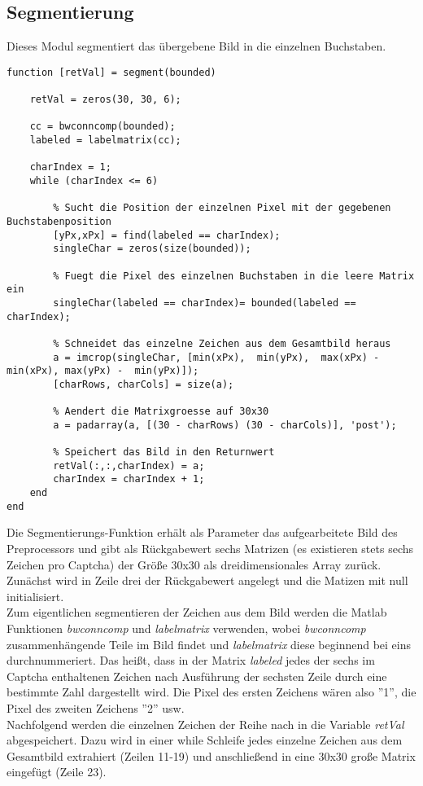 \subsection{Segmentierung}
Dieses Modul segmentiert das übergebene Bild in die einzelnen Buchstaben.
\begin{lstlisting}
function [retVal] = segment(bounded)

    retVal = zeros(30, 30, 6);

    cc = bwconncomp(bounded);
    labeled = labelmatrix(cc);
  
    charIndex = 1;
    while (charIndex <= 6)

        % Sucht die Position der einzelnen Pixel mit der gegebenen Buchstabenposition
        [yPx,xPx] = find(labeled == charIndex);
        singleChar = zeros(size(bounded)); 

        % Fuegt die Pixel des einzelnen Buchstaben in die leere Matrix ein
        singleChar(labeled == charIndex)= bounded(labeled == charIndex); 

        % Schneidet das einzelne Zeichen aus dem Gesamtbild heraus
        a = imcrop(singleChar, [min(xPx),  min(yPx),  max(xPx) - min(xPx), max(yPx) -  min(yPx)]);
        [charRows, charCols] = size(a);

        % Aendert die Matrixgroesse auf 30x30
        a = padarray(a, [(30 - charRows) (30 - charCols)], 'post');
        
        % Speichert das Bild in den Returnwert
        retVal(:,:,charIndex) = a;
        charIndex = charIndex + 1;
    end
end
\end{lstlisting}
Die Segmentierungs-Funktion erhält als Parameter das aufgearbeitete Bild des Preprocessors und gibt als Rückgabewert sechs Matrizen (es existieren stets sechs Zeichen pro Captcha) der Größe 30x30 als dreidimensionales Array zurück.\\
Zunächst wird in Zeile drei der Rückgabewert angelegt und die Matizen mit null initialisiert.\\
Zum eigentlichen segmentieren der Zeichen aus dem Bild werden die Matlab Funktionen \textit{bwconncomp} und \textit{labelmatrix} verwenden, wobei \textit{bwconncomp} zusammenhängende Teile im Bild findet und \textit{labelmatrix} diese beginnend bei eins durchnummeriert. Das heißt, dass in der Matrix \textit{labeled} jedes der sechs im Captcha enthaltenen Zeichen nach Ausführung der sechsten Zeile durch eine bestimmte Zahl dargestellt wird. Die Pixel des ersten Zeichens wären also ''1'', die Pixel des zweiten Zeichens ''2'' usw.\\
Nachfolgend werden die einzelnen Zeichen der Reihe nach in die Variable \textit{retVal} abgespeichert. Dazu wird in einer while Schleife jedes einzelne Zeichen aus dem Gesamtbild extrahiert (Zeilen 11-19) und anschließend in eine 30x30 große Matrix eingefügt (Zeile 23). 
\newpage

